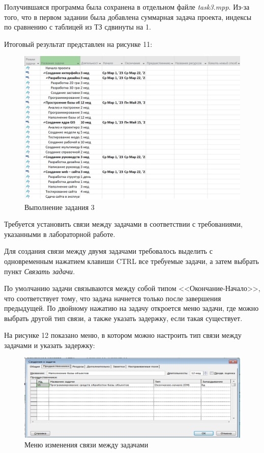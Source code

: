 Получившаяся программа была сохранена в отдельном файле \textit{task3.mpp}. 
Из-за того, что в первом задании была добавлена суммарная задача проекта, индексы по сравнению с таблицей из ТЗ сдвинуты на 1.

Итоговый результат представлен на рисунке 11:
\FloatBarrier
\begin{figure}[h]	
	\begin{center}
		\includegraphics[width=\linewidth]{inc/tasks1.png}
	\end{center}
	\captionsetup{justification=centering}
	\caption{Выполнение задания 3}
\end{figure}
\FloatBarrier

Требуется установить связи между задачами в соответствии с требованиями, указанными в лабораторной работе.

Для создания связи между двумя задачами требовалось выделить с одновременным нажатием клавиши CTRL все требуемые задачи, а затем выбрать пункт \textit{Связать задачи}.

По умолчанию задачи связываются между собой типом <<Окончание-Начало>>, что соответствует тому, что задача начнется только после завершения предыдущей. 
По двойному нажатию на задачу откроется меню задачи, где можно выбрать другой тип связи, а также указать задержку, если такая существует.

На рисунке 12 показано меню, в котором можно настроить тип связи между задачами и указать задержку:
\FloatBarrier
\begin{figure}[h]	
	\begin{center}
		\includegraphics[width=\linewidth]{inc/4-1.png}
	\end{center}
	\captionsetup{justification=centering}
	\caption{Меню изменения связи между задачами}
\end{figure}
\FloatBarrier


